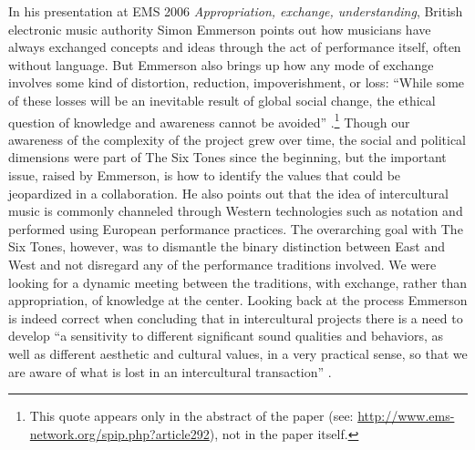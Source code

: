 \documentclass[a4paper]{article}
\begin{document}
In his presentation at EMS 2006 \emph{Appropriation, exchange, understanding}, British electronic music authority Simon Emmerson points out how musicians have always exchanged concepts and ideas through the act of performance itself, often without language. But Emmerson also brings up how any mode of exchange involves some kind of distortion, reduction, impoverishment, or loss: ``While some of these losses will be an inevitable result of global social change, the ethical question of knowledge and awareness cannot be avoided''  \autocite{emmerson06}.\footnote{This quote appears only in the abstract of the paper (see: \url{http://www.ems-network.org/spip.php?article292}), not in the paper itself.} Though our awareness of the complexity of the project grew over time, the social and political dimensions were part of The Six Tones since the beginning, but the important issue, raised by Emmerson, is how to identify the values that could be jeopardized in a collaboration. He also points out that the idea of intercultural music is commonly channeled through Western technologies such as notation and performed using European performance practices. The overarching goal with The Six Tones, however, was to dismantle the binary distinction between East and West and not disregard any of the performance traditions involved. We were looking for a dynamic meeting between the traditions, with exchange, rather than appropriation, of knowledge at the center. Looking back at the process Emmerson is indeed correct when concluding that in intercultural projects there is a need to develop ``a sensitivity to different significant sound qualities and behaviors, as well as different aesthetic and cultural values, in a very practical sense, so that we are aware of what is lost in an intercultural transaction'' \autocite[8]{emmerson06}.


\end{document}
